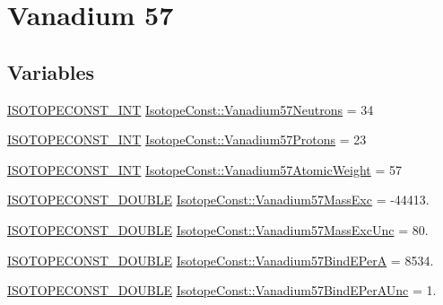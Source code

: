 \hypertarget{group___isotope_const-_vanadium-_v57}{}\section{Vanadium 57}
\label{group___isotope_const-_vanadium-_v57}
\subsection*{Variables}
\begin{DoxyCompactItemize}
\item 
\mbox{\hyperlink{group___isotope_const-_macros_ga5f18360b3e99483a35c32d789e62621c}{I\+S\+O\+T\+O\+P\+E\+C\+O\+N\+S\+T\+\_\+\+I\+NT}} \mbox{\hyperlink{group___isotope_const-_vanadium-_v57_ga316f21fa490fe596399e36e3d3ebcc83}{Isotope\+Const\+::\+Vanadium57\+Neutrons}} = 34
\item 
\mbox{\hyperlink{group___isotope_const-_macros_ga5f18360b3e99483a35c32d789e62621c}{I\+S\+O\+T\+O\+P\+E\+C\+O\+N\+S\+T\+\_\+\+I\+NT}} \mbox{\hyperlink{group___isotope_const-_vanadium-_v57_ga8b7d9e7da01a26d4e45ab7acb455c5e7}{Isotope\+Const\+::\+Vanadium57\+Protons}} = 23
\item 
\mbox{\hyperlink{group___isotope_const-_macros_ga5f18360b3e99483a35c32d789e62621c}{I\+S\+O\+T\+O\+P\+E\+C\+O\+N\+S\+T\+\_\+\+I\+NT}} \mbox{\hyperlink{group___isotope_const-_vanadium-_v57_ga131928e244695ea7781b13c09f7acfd3}{Isotope\+Const\+::\+Vanadium57\+Atomic\+Weight}} = 57
\item 
\mbox{\hyperlink{group___isotope_const-_macros_ga8f45a7272ce02c0b4c65c44636ed719a}{I\+S\+O\+T\+O\+P\+E\+C\+O\+N\+S\+T\+\_\+\+D\+O\+U\+B\+LE}} \mbox{\hyperlink{group___isotope_const-_vanadium-_v57_ga93ce047865c4a7e8a3fe0b21397220f7}{Isotope\+Const\+::\+Vanadium57\+Mass\+Exc}} = -\/44413.
\item 
\mbox{\hyperlink{group___isotope_const-_macros_ga8f45a7272ce02c0b4c65c44636ed719a}{I\+S\+O\+T\+O\+P\+E\+C\+O\+N\+S\+T\+\_\+\+D\+O\+U\+B\+LE}} \mbox{\hyperlink{group___isotope_const-_vanadium-_v57_gad7569068869cdd2f58e455db8702b5ab}{Isotope\+Const\+::\+Vanadium57\+Mass\+Exc\+Unc}} = 80.
\item 
\mbox{\hyperlink{group___isotope_const-_macros_ga8f45a7272ce02c0b4c65c44636ed719a}{I\+S\+O\+T\+O\+P\+E\+C\+O\+N\+S\+T\+\_\+\+D\+O\+U\+B\+LE}} \mbox{\hyperlink{group___isotope_const-_vanadium-_v57_ga210fa7af80eb5b9bbc7b786e0f033da8}{Isotope\+Const\+::\+Vanadium57\+Bind\+E\+PerA}} = 8534.
\item 
\mbox{\hyperlink{group___isotope_const-_macros_ga8f45a7272ce02c0b4c65c44636ed719a}{I\+S\+O\+T\+O\+P\+E\+C\+O\+N\+S\+T\+\_\+\+D\+O\+U\+B\+LE}} \mbox{\hyperlink{group___isotope_const-_vanadium-_v57_ga29dd8a64d0bf69bcb8780cb585187462}{Isotope\+Const\+::\+Vanadium57\+Bind\+E\+Per\+A\+Unc}} = 1.

\end{DoxyCompactItemize}
